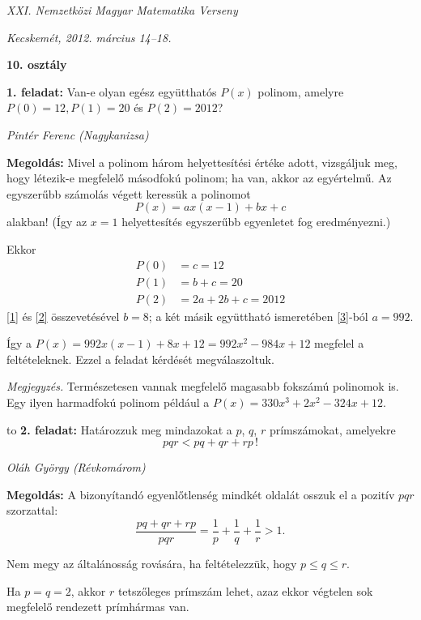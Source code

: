 \documentclass[a4paper,10pt]{article}
\newcommand{\ki}[2]{\hfill {\it #1 (#2)}\medskip}
\newcommand{\vonal}{\hbox to \hsize{\hskip2truecm\hrulefill\hskip2truecm}}
\begin{document}
\begin{center} \Large {\em XXI. Nemzetközi Magyar Matematika Verseny} \end{center}
\begin{center} \large{\em Kecskemét, 2012. március 14--18.} \end{center}
\smallskip
\begin{center} \large{\bf 10. osztály} \end{center}
\bigskip 

{\bf 1. feladat: } Van-e olyan egész együtthatós $P(x)$ polinom, amelyre 
$P(0)=12, P(1)=20$ és $P(2)=2012$?

\ki{Pintér Ferenc}{Nagykanizsa}\medskip

{\bf Megoldás: } Mivel a polinom három helyettesítési értéke adott, vizsgáljuk meg, hogy létezik-e megfelelő másodfokú polinom; ha van, akkor az egyértelmű. Az egyszerűbb számolás
végett keressük a polinomot
\[P(x)=ax(x-1)+bx+c\]
alakban! (Így az $x=1$ helyettesítés egyszerűbb egyenletet fog eredményezni.)

Ekkor
\begin{align}
\label{1}P(0)&=c=12\\
\label{2}P(1)&=b+c=20\\
\label{3}P(2)&=2a+2b+c=2012
\end{align}
\eqref{1} és \eqref{2} összevetésével $b=8$; a két másik együttható ismeretében \eqref{3}-ból $a=992$.

Így a $P(x)=992x(x-1)+8x+12=992x^2-984x+12$ megfelel a feltételeknek. Ezzel a feladat kérdését megválaszoltuk.

{\it Megjegyzés.} Természetesen vannak megfelelő magasabb fokszámú polinomok is. Egy ilyen
harmadfokú polinom például a $P(x)=330x^3+2x^2-324x+12$.

\medskip

\vonal
{\bf 2. feladat: } Határozzuk meg mindazokat a $p$, $q$, $r$ prímszámokat, amelyekre
\[pqr < pq + qr + rp\, !\]

\ki{Oláh György}{Révkomárom}\medskip

{\bf Megoldás: } A bizonyítandó egyenlőtlenség mindkét oldalát osszuk el a pozitív $pqr$ szorzattal:
\[\frac{pq+qr+rp}{pqr}=\frac{1}{p}+\frac{1}{q}+\frac{1}{r}>1.\]

Nem megy az általánosság rovására, ha feltételezzük, hogy $p\le q\le r$.

Ha $p=q=2$, akkor $r$ tetszőleges prímszám lehet, azaz ekkor végtelen sok megfelelő
rendezett prímhármas van.
\end{document}
